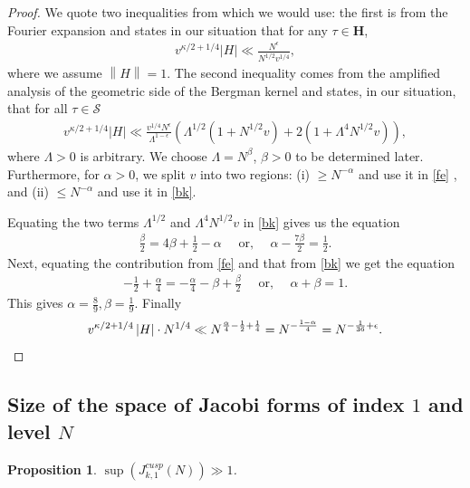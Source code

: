 \documentclass[11pt]{amsart}
\numberwithin{equation}{section}
\theoremstyle{plain}
\newtheorem{prop}[thm]{Proposition}
\theoremstyle{definition}
\newcommand{\h}{\mf H}
\newcommand{\mf}{\mathbf}
\newcommand{\mc}{\mathcal}
\newcommand*{\norm}[1]{\left\lVert#1\right\rVert}
\newcommand{\q}{\quad}
\newcommand{\jkn}{J^{cusp}_{k,1}(N)}
\begin{document}
\begin{proof}
    We quote two inequalities from \cite{Kir} which we would use: the first is from the Fourier expansion and states in our situation that for any $\tau \in \h$,
    \begin{align} \label{fe}
        v^{\kappa/2+1/4} \left| H \right| \ll \frac{N^\epsilon }{N^{1/2} v^{1/4}},
    \end{align}
    where we assume $\norm{H}=1$. The second inequality comes from the amplified analysis of the geometric side of the Bergman kernel and states, in our situation, that for all $\tau \in \mc S$
    \begin{align} \label{bk}
        v^{\kappa/2+1/4} \left| H \right| \ll \frac{v^{1/4} N^\epsilon}{\Lambda^{1-\epsilon}} \left( \Lambda^{1/2}(1+ N^{1/2} v) + 2(1+ \Lambda^4 N^{1/2} v) \right),
    \end{align}
where $\Lambda>0$ is arbitrary. We choose $\Lambda = N^\beta$, $\beta>0$ to be determined later. Furthermore, for $\alpha>0$, we split $v$ into two regions: (i)  $\ge N^{-\alpha}$ and use it in \eqref{fe}
, and (ii)  $\le N^{-\alpha}$ and use it in \eqref{bk}. 

Equating the two terms $\Lambda^{1/2}$ and $\Lambda^4 N^{1/2}  v$ in \eqref{bk} gives us the equation
\begin{align}
    \frac{\beta}{2} = 4 \beta + \frac{1}{2} - \alpha \q \text{  or,  } \q \alpha - \frac{7 \beta}{2}= \frac{1}{2}.
\end{align}
Next, equating the contribution from \eqref{fe} and that from \eqref{bk} we get the equation
\begin{align}
    - \frac{1}{2} +\frac{\alpha}{4} = -\frac{\alpha}{4} - \beta + \frac{\beta}{2}\q \text{  or,  } \q \alpha + \beta =1.
\end{align}
    This gives $\alpha = \frac{8}{9}, \beta = \frac{1}{9}$. Finally
    \begin{equation}
        v^{\kappa/2+1/4} \left| H \right|  \cdot N^{1/4} \ll N^{\frac{\alpha}{4} - \frac{1}{2} + \frac{1}{4}} = N^{- \frac{1-\alpha}{4}} = N^{- \frac{1}{36} +\epsilon}. \qedhere
    \end{equation} 
\end{proof}

\subsection{Size of the space of Jacobi forms of index \texorpdfstring{$1$ }{1}and  level \texorpdfstring{$N$}{N}}
\begin{prop}
 $\sup(\jkn) \gg   1 $.
\end{prop}
\end{document}

